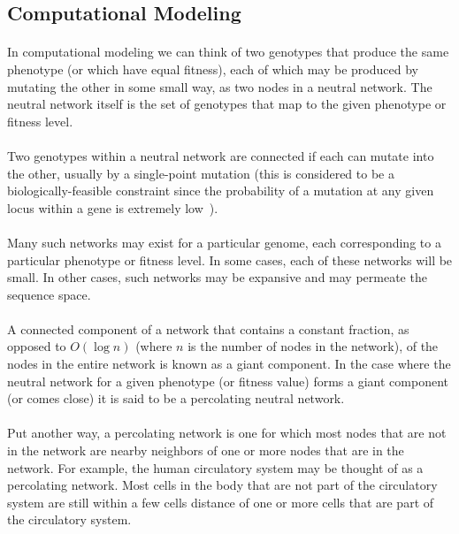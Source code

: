 \documentclass[12pt,letterpaper,titlepage]{article}
\begin{document}
\subsection{Computational Modeling}

\paragraph{}
In computational modeling we can think of two genotypes that produce the same
phenotype (or which have equal fitness), each of which may be produced by
mutating the other in some small way, as two nodes in a neutral network. The
neutral network itself is the set of genotypes that map to the given phenotype
or fitness level.

\paragraph{}
Two genotypes within a neutral network are connected if each
can mutate into the other, usually by a single-point mutation (this is
considered to be a biologically-feasible constraint since the probability of a
mutation at any given locus within a gene is extremely low~\cite{Orr2005}).

\paragraph{}
Many such networks may exist for a particular genome, each corresponding to a
particular phenotype or fitness level. In some cases, each of these networks
will be small. In other cases, such networks may be expansive and may permeate
the sequence space.

\paragraph{}
A connected component of a network that contains a constant fraction, as
opposed to $O\left(\log n\right)$ (where $n$ is the number of nodes in the
network), of the nodes in the entire network is known as a giant component. In
the case where the neutral network for a given phenotype (or fitness value)
forms a giant component (or comes close) it is said to be a percolating neutral
network.

\paragraph{}
Put another way, a percolating network is one for which most nodes that are not
in the network are nearby neighbors of one or more nodes that are in the
network. For example, the human circulatory system may be thought of as a
percolating network. Most cells in the body that are not part of the
circulatory system are still within a few cells distance of one or more cells
that are part of the circulatory system.
\end{document}

